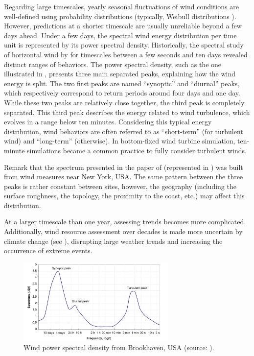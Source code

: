 Regarding large timescales, yearly seasonal fluctuations of wind conditions are well-defined using probability distributions (typically, Weibull distributions \citealp{burton_2021_wind_handbook}). 
However, predictions at a shorter timescale are usually unreliable beyond a few days ahead. 
Under a few days, the spectral wind energy distribution per time unit is represented by its power spectral density. 
Historically, the spectral study of horizontal wind by \citet{van_1957_wind_psd} for timescales between a few seconds and ten days revealed distinct ranges of behaviors. 
The power spectral density, such as the one illustrated in , presents three main separated peaks, explaining how the wind energy is split. 
The two first peaks are named ``synoptic'' and ``diurnal'' peaks, which respectively correspond to return periods around four days and one day. 
While these two peaks are relatively close together, the third peak is completely separated. 
This third peak describes the energy related to wind turbulence, which evolves in a range below ten minutes. 
Considering this typical energy distribution, wind behaviors are often referred to as ``short-term'' (for turbulent wind) and ``long-term'' (otherwise). 
In bottom-fixed wind turbine simulation, ten-minute simulations became a common practice to fully consider turbulent winds. 

Remark that the spectrum presented in the paper of \citet{van_1957_wind_psd} (represented in ) was built from wind measures near New York, USA. 
The same pattern between the three peaks is rather constant between sites, however, the geography (including the surface roughness, the topology, the proximity to the coast, etc.) may affect this distribution. 

At a larger timescale than one year, assessing trends becomes more complicated. 
Additionally, wind resource assessment over decades is made more uncertain by climate change (see \citealp{nagababu_2023_climate_change}), disrupting large weather trends and increasing the occurrence of extreme events. 

\begin{figure}
    \centering
    \includegraphics[width=0.7\textwidth]{./part1/figures/wind_spectrum.png}
    \caption{Wind power spectral density from Brookhaven, USA (source: \citealp{burton_2021_wind_handbook}).}
    \label{fig:wind_psd}
\end{figure}





